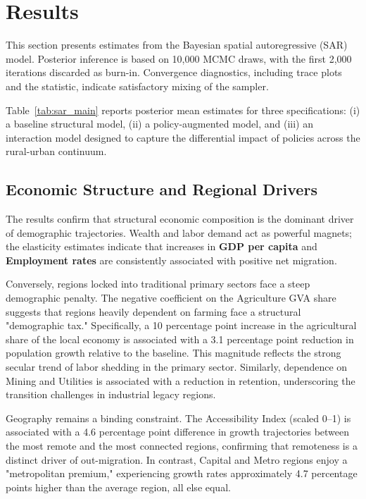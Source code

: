 \documentclass[
	a4paper, %
	10pt, %
]{LTJournalArticle}
\begin{document}
\section{Results}

This section presents estimates from the Bayesian spatial autoregressive (SAR) model. Posterior inference is based on 10,000 MCMC draws, with the first 2,000 iterations discarded as burn-in. Convergence diagnostics, including trace plots and the \citealp{geweke1991evaluating} statistic, indicate satisfactory mixing of the sampler.

Table~\ref{tab:sar_main} reports posterior mean estimates for three specifications: (i) a baseline structural model, (ii) a policy-augmented model, and (iii) an interaction model designed to capture the differential impact of policies across the rural-urban continuum.

\subsection{Economic Structure and Regional Drivers}

The results confirm that structural economic composition is the dominant driver of demographic trajectories. Wealth and labor demand act as powerful magnets; the elasticity estimates indicate that increases in \textbf{GDP per capita} and \textbf{Employment rates} are consistently associated with positive net migration.

Conversely, regions locked into traditional primary sectors face a steep demographic penalty. The negative coefficient on the Agriculture GVA share suggests that regions heavily dependent on farming face a structural "demographic tax." Specifically, a 10 percentage point increase in the agricultural share of the local economy is associated with a 3.1 percentage point reduction in population growth relative to the baseline. This magnitude reflects the strong secular trend of labor shedding in the primary sector. Similarly, dependence on Mining and Utilities is associated with a reduction in retention, underscoring the transition challenges in industrial legacy regions.

Geography remains a binding constraint. The Accessibility Index (scaled 0–1) is associated with a 4.6 percentage point difference in growth trajectories between the most remote and the most connected regions, confirming that remoteness is a distinct driver of out-migration. In contrast, Capital and Metro regions enjoy a "metropolitan premium," experiencing growth rates approximately 4.7 percentage points higher than the average region, all else equal.
\end{document}

